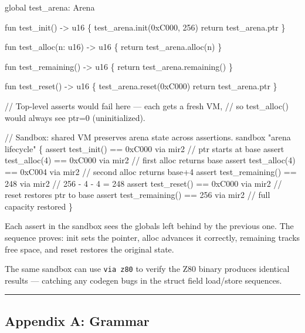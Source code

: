 \documentclass[
  11pt,
]{article}
\newenvironment{Shaded}{}{}
\newcommand{\NormalTok}[1]{#1}
\begin{document}
\begin{Shaded}
\begin{Highlighting}[]
\NormalTok{global test\_arena: Arena}

\NormalTok{fun test\_init() {-}\textgreater{} u16 \{}
\NormalTok{    test\_arena.init(0xC000, 256)}
\NormalTok{    return test\_arena.ptr}
\NormalTok{\}}

\NormalTok{fun test\_alloc(n: u16) {-}\textgreater{} u16 \{}
\NormalTok{    return test\_arena.alloc(n)}
\NormalTok{\}}

\NormalTok{fun test\_remaining() {-}\textgreater{} u16 \{}
\NormalTok{    return test\_arena.remaining()}
\NormalTok{\}}

\NormalTok{fun test\_reset() {-}\textgreater{} u16 \{}
\NormalTok{    test\_arena.reset(0xC000)}
\NormalTok{    return test\_arena.ptr}
\NormalTok{\}}

\NormalTok{// Top{-}level asserts would fail here — each gets a fresh VM,}
\NormalTok{// so test\_alloc() would always see ptr=0 (uninitialized).}

\NormalTok{// Sandbox: shared VM preserves arena state across assertions.}
\NormalTok{sandbox "arena lifecycle" \{}
\NormalTok{    assert test\_init() == 0xC000 via mir2        // ptr starts at base}
\NormalTok{    assert test\_alloc(4) == 0xC000 via mir2      // first alloc returns base}
\NormalTok{    assert test\_alloc(4) == 0xC004 via mir2      // second alloc returns base+4}
\NormalTok{    assert test\_remaining() == 248 via mir2       // 256 {-} 4 {-} 4 = 248}
\NormalTok{    assert test\_reset() == 0xC000 via mir2       // reset restores ptr to base}
\NormalTok{    assert test\_remaining() == 256 via mir2       // full capacity restored}
\NormalTok{\}}
\end{Highlighting}
\end{Shaded}

Each assert in the sandbox sees the globals left behind by the previous
one. The sequence proves: init sets the pointer, alloc advances it
correctly, remaining tracks free space, and reset restores the original
state.

The same sandbox can use \texttt{via\ z80} to verify the Z80 binary
produces identical results --- catching any codegen bugs in the struct
field load/store sequences.

\begin{center}\rule{0.5\linewidth}{0.5pt}\end{center}

\subsection{Appendix A: Grammar}\label{appendix-a-grammar}
\end{document}
